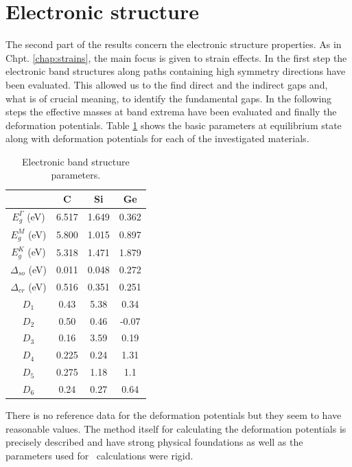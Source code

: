 \ornament

\section{Electronic structure}

The second part of the results concern the electronic structure properties.
As in Chpt. \ref{chap:strains}, the main focus is given to strain effects. In the first step the electronic band structures along  paths containing high symmetry directions have been evaluated. 
This allowed us to the find direct and the indirect gaps and, what is of crucial meaning, to identify the fundamental gaps. In the following steps the effective masses at band extrema have been evaluated and finally the deformation potentials. Table \ref{Tab:wz_electronic} shows the basic parameters at equilibrium state along with deformation potentials for each of the investigated materials.

\begin{table}[!htbp]
	\centering
	\caption{Electronic band structure parameters.}
	\label{Tab:wz_electronic}
	\begin{tabular}{|c|c|c|c|}
		\hline
		& C & Si & Ge \\ \hline
		$E_g^\Gamma$ (eV) & 6.517 & 1.649 & 0.362 \\ \hline
		$E_g^M$ (eV) & 5.800 & 1.015 & 0.897 \\ \hline
		$E_g^K$ (eV) & 5.318 & 1.471 & 1.879 \\ \hline
		$\Delta_{so}$ (eV) & 0.011 & 0.048 & 0.272 \\ \hline
		$\Delta_{cr}$ (eV) & 0.516 & 0.351 & 0.251 \\ \hline
		$D_1$ & 0.43 & 5.38 & 0.34 \\ \hline
		$D_2$ & 0.50 & 0.46 & -0.07 \\ \hline
		$D_3$ & 0.16 & 3.59 & 0.19 \\ \hline
		$D_4$ & 0.225 & 0.24 & 1.31 \\ \hline
		$D_5$ & 0.275 & 1.18 & 1.1 \\ \hline
		$D_6$ & 0.24 & 0.27 & 0.64 \\ \hline
	\end{tabular}
\end{table}

There is no reference data for the deformation potentials but they seem to have reasonable values.
The method itself for calculating the deformation potentials is precisely described and have strong physical foundations as well as the parameters used for \abinitio\ calculations were rigid.

